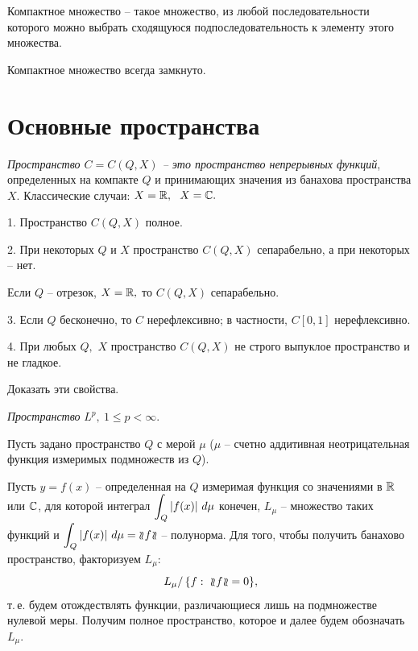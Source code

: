   Компактное множество -- такое множество, из любой
 последовательности
 которого можно выбрать сходящуюся подпоследовательность к элементу этого множества.

 Компактное множество всегда замкнуто.

 \vspace{3mm}
 \section{Основные пространства}
  \vspace{3mm}

 {\it Пространство $C=C(Q,X)$ -- это пространство непрерывных функций}, определенных
 на компакте $Q$ и принимающих значения из банахова пространства $X.$
 Классические случаи: $X=\mathbb{R},$  $\ X=\mathbb{C}.$
 \vspace{3mm}

 1. {Пространство $C(Q,X)$} полное.
 \vspace{3mm}

 2. При некоторых $Q$ и $X$ пространство {$C(Q,X)$} сепарабельно, а при некоторых -- нет.

 Если $Q$ -- отрезок, $X=\mathbb{R},$ то $C(Q,X)$ сепарабельно.
  \vspace{3mm}

 3. Если $Q$ бесконечно, то $C$ нерефлексивно; в частности, $C[0,1]$ нерефлексивно.
  \vspace{3mm}

 4. {При любых $Q,$ $X$ пространство $C(Q,X)$} не строго выпуклое пространство {и не} {гладкое.}
\vspace{3mm}

 \ex %
{Доказать эти свойства.}

{{\it Пространство} $ L^{{p}},~ 1\le p< \infty.$}

 Пусть задано пространство $Q$ с мерой $\mu$ ($\mu$ --
 счетно аддитивная неотрицательная функция измеримых подмножеств из $Q$).

 Пусть $y=f(x)$ -- определенная на $Q$ измеримая
 функция {со значениями в $\mathbb{R}$ или $\mathbb{C}$,} для которой
 интеграл  $\displaystyle\int_Q |f(x)|\ d\mu$ конечен, $L_{{\mu}}$ -- множество таких функций и
 $\ds\int_Q |f(x)|\ d\mu=\pnl f\pnr$ -- полунорма.
 Для того, чтобы получить банахово пространство, факторизуем $L_{{\mu}}$:
 $$
  \left. L_{{\mu}} \right/ \{f:\ \wr\!\!\wr\! f\!\wr\!\!\wr =0{\}},
  $$
 {т.\,е. будем отождествлять функции, различающиеся лишь на подмножестве нулевой} {меры.}
 Получим полное пространство, которое и далее будем обозначать $L_{{\mu}}.$

